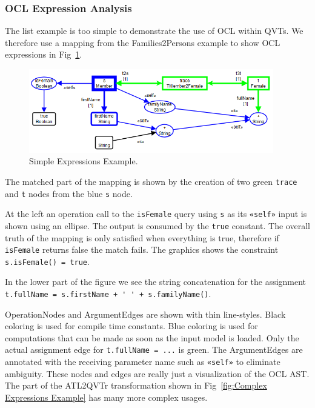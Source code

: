 \documentclass{llncs}
\begin{document}

\subsubsection{OCL Expression Analysis}
	
The list example is too simple to demonstrate the use of OCL within QVTs. We therefore use a mapping from the Families2Persons example to show OCL expressions in Fig~\ref{fig:Simple Expressions Example}.

\begin{figure}[h]
	\centering
	\includegraphics[width=0.95\textwidth]{SimpleExpressionExample.png}
	\caption{Simple Expressions Example.}
	\label{fig:Simple Expressions Example}
\end{figure}

The matched part of the mapping is shown by the creation of two green \verb$trace$ and \verb$t$ nodes from the blue \verb$s$ node.

At the left an operation call to the \verb$isFemale$ query using \verb$s$ as its \verb$«self»$ input is shown using an ellipse. The output is consumed by the \verb$true$ constant. The overall truth of the mapping is only satisfied when everything is true, therefore if \verb$isFemale$ returns false the match fails. The graphics shows the constraint \verb$s.isFemale() = true$.

In the lower part of the figure we see the string concatenation for the assignment \verb$t.fullName = s.firstName + ' ' + s.familyName()$.

OperationNodes and ArgumentEdges are shown with thin line-styles. Black coloring is used for compile time constants. Blue coloring is used for computations that can be made as soon as the input model is loaded. Only the actual assignment edge for \verb$t.fullName = ...$ is green. The ArgumentEdges are annotated with the receiving parameter name such as \verb$«self»$ to eliminate ambiguity. These nodes and edges are really just a visualization of the OCL AST. The part of the ATL2QVTr transformation shown in Fig~\ref{fig:Complex Expressions Example} has many more complex usages.
\end{document}
